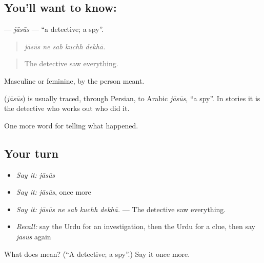 \subsection*{You'll want to know: }
\textbf{} — \emph{jāsūs} — \textquotedblleft{}a detective; a spy\textquotedblright{}.

\begin{quote}
    
\end{quote}

\begin{quote}
\emph{jāsūs ne sab kuchh dekhā.}
\end{quote}

\begin{quote}
The detective saw everything.
\end{quote}

Masculine or feminine, by the person meant.

\begin{cousinweb}
\textbf{} (\emph{jāsūs}) is usually traced, through Persian, to Arabic \emph{jāsūs}, \textquotedblleft{}a spy\textquotedblright{}. In stories it is the detective who works out who did it.
\end{cousinweb}

\begin{grammarlens}[title={What you've built}]
One more word for telling what happened.
\end{grammarlens}

\subsection*{Your turn}
\begin{itemize}
\raggedright
  \item \emph{Say it:} \emph{jāsūs}
  \item \emph{Say it:} \emph{jāsūs}, once more
  \item \emph{Say it:} \emph{jāsūs ne sab kuchh dekhā.} — The detective saw everything.
  \item \emph{Recall:} say the Urdu for an investigation, then the Urdu for a clue, then say \emph{jāsūs} again
\end{itemize}

\begin{tcolorbox}[breakable,colback=teal!4,colframe=teal!35!black,title={Before you move on}]
What does  mean? (\textquotedblleft{}A detective; a spy\textquotedblright{}.) Say it once more.
\end{tcolorbox}
